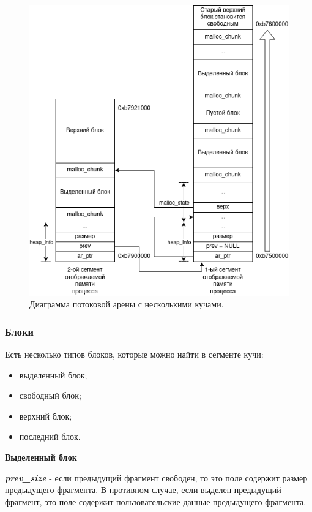 \begin{figure}[!h]
	\begin{center}
		\includegraphics[scale=0.6]{images/glibc-malloc-thread-arena-multi.png}
		\caption{Диаграмма потоковой арены с несколькими кучами.}
		\label{glibc-malloc-thread-arena-multi}
	\end{center}
\end{figure}

\subsubsection{Блоки}
Есть несколько типов блоков, которые можно найти в сегменте кучи:
\begin{itemize}
	\item выделенный блок;
	\item свободный блок;
	\item верхний блок;
	\item последний блок.
\end{itemize}

\textbf{Выделенный блок}

\textit{\textbf{prev\_size}} - если предыдущий фрагмент свободен, то это поле содержит размер предыдущего фрагмента. В противном случае, если выделен предыдущий фрагмент, это поле содержит пользовательские данные предыдущего фрагмента.

